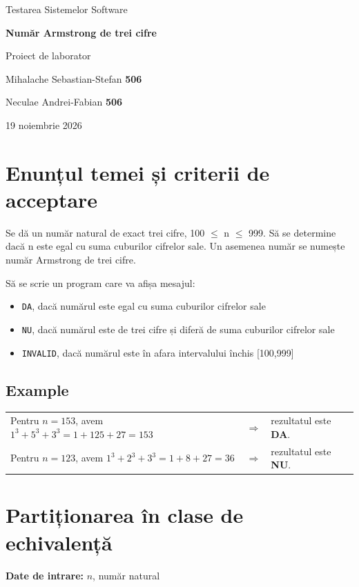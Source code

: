 \documentclass[11pt,a4paper]{article}
\begin{document}
\begin{titlepage}
\centering
{\Large Testarea Sistemelor Software\par}
\vspace{22mm}
{\color{accent}\Huge\bfseries Număr Armstrong de trei cifre\par}
\vspace{10mm}
{\Large Proiect de laborator\par}
\vspace{6mm}
{\large Mihalache Sebastian-Stefan \textbf{506}\par}
{\large Neculae Andrei-Fabian \textbf{506}\par}
\vfill
\vspace{12mm}
{\large 19 noiembrie 2026\par}
\end{titlepage}
\section{Enunțul temei și criterii de acceptare}
Se dă un număr natural de exact trei cifre, 100 \ensuremath{\leq} n \ensuremath{\leq} 999.\allowbreak{} Să se determine dacă n este egal cu suma cuburilor cifrelor sale.\allowbreak{} Un asemenea număr se numește număr Armstrong de trei cifre.\allowbreak{}

Să se scrie un program care va afișa mesajul:
\begin{itemize}[label=\textendash]
\item \texttt{DA}, dacă numărul este egal cu suma cuburilor cifrelor sale
\item \texttt{NU}, dacă numărul este de trei cifre și diferă de suma cuburilor cifrelor sale
\item \texttt{INVALID}, dacă numărul este în afara intervalului închis [100,999]
\end{itemize}

\subsection{Example}

\begin{tabular}{@{}l@{\quad}c@{\quad}l@{}}
Pentru $n=153$, avem $1^{3}+5^{3}+3^{3}=1+125+27=153$
& $\Rightarrow$ & rezultatul este \textbf{DA}. \\[5pt]
Pentru $n=123$, avem $1^{3}+2^{3}+3^{3}=1+8+27=36$
& $\Rightarrow$ & rezultatul este \textbf{NU}.
\end{tabular}

\section{Partiționarea în clase de echivalență}
\textbf{Date de intrare:} $n$, număr natural
\end{document}
